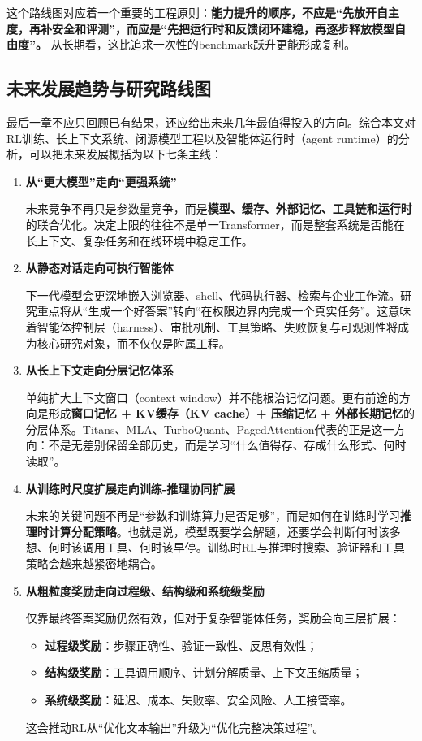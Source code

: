 \documentclass[12pt,a4paper]{article}
\begin{document}
这个路线图对应着一个重要的工程原则：\textbf{能力提升的顺序，不应是“先放开自主度，再补安全和评测”，而应是“先把运行时和反馈闭环建稳，再逐步释放模型自由度”。} 从长期看，这比追求一次性的benchmark跃升更能形成复利。

\subsection{未来发展趋势与研究路线图}

最后一章不应只回顾已有结果，还应给出未来几年最值得投入的方向。综合本文对RL训练、长上下文系统、闭源模型工程以及智能体运行时（agent runtime）的分析，可以把未来发展概括为以下七条主线：

\begin{enumerate}
    \item \textbf{从“更大模型”走向“更强系统”}
    
    未来竞争不再只是参数量竞争，而是\textbf{模型、缓存、外部记忆、工具链和运行时}的联合优化。决定上限的往往不是单一Transformer，而是整套系统是否能在长上下文、复杂任务和在线环境中稳定工作。
    
    \item \textbf{从静态对话走向可执行智能体}
    
    下一代模型会更深地嵌入浏览器、shell、代码执行器、检索与企业工作流。研究重点将从“生成一个好答案”转向“在权限边界内完成一个真实任务”。这意味着智能体控制层（harness）、审批机制、工具策略、失败恢复与可观测性将成为核心研究对象，而不仅仅是附属工程。
    
    \item \textbf{从长上下文走向分层记忆体系}
    
    单纯扩大上下文窗口（context window）并不能根治记忆问题。更有前途的方向是形成\textbf{窗口记忆 + KV缓存（KV cache）+ 压缩记忆 + 外部长期记忆}的分层体系。Titans、MLA、TurboQuant、PagedAttention代表的正是这一方向：不是无差别保留全部历史，而是学习“什么值得存、存成什么形式、何时读取”。
    
    \item \textbf{从训练时尺度扩展走向训练-推理协同扩展}
    
    未来的关键问题不再是“参数和训练算力是否足够”，而是如何在训练时学习\textbf{推理时计算分配策略}。也就是说，模型既要学会解题，还要学会判断何时该多想、何时该调用工具、何时该早停。训练时RL与推理时搜索、验证器和工具策略会越来越紧密地耦合。
    
    \item \textbf{从粗粒度奖励走向过程级、结构级和系统级奖励}
    
    仅靠最终答案奖励仍然有效，但对于复杂智能体任务，奖励会向三层扩展：
    \begin{itemize}
        \item \textbf{过程级奖励}：步骤正确性、验证一致性、反思有效性；
        \item \textbf{结构级奖励}：工具调用顺序、计划分解质量、上下文压缩质量；
        \item \textbf{系统级奖励}：延迟、成本、失败率、安全风险、人工接管率。
    \end{itemize}
    这会推动RL从“优化文本输出”升级为“优化完整决策过程”。
    

\end{enumerate}
\end{document}
